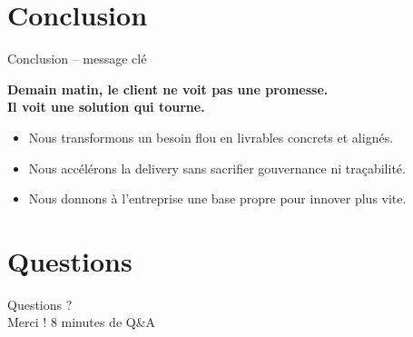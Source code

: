 \documentclass[aspectratio=169,10pt]{beamer}
\begin{document}
\section{Conclusion}
\begin{frame}{Conclusion -- message clé}
\begin{center}
{\Large \textbf{Demain matin, le client ne voit pas une promesse.\\Il voit une solution qui tourne.}}
\end{center}
\vspace{0.4cm}
\begin{itemize}
  \item Nous transformons un besoin flou en livrables concrets et alignés.
  \item Nous accélérons la delivery sans sacrifier gouvernance ni traçabilité.
  \item Nous donnons à l'entreprise une base propre pour innover plus vite.
\end{itemize}
\vspace{0.3cm}
\begin{center}
\end{center}
\end{frame}

\section{Questions}
\begin{frame}[standout]
\centering
{\Huge Questions ?}\\[0.4cm]
{\Large Merci !}
\vfill
\small 8 minutes de Q\&A
\end{frame}
\end{document}
